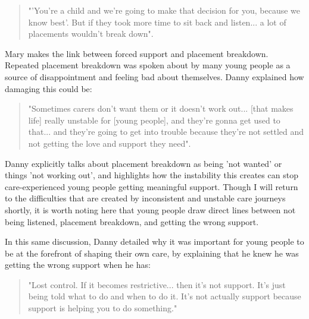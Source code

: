\begin{quote}
"'You're a child and we're going to make that decision for you, because we know best'. But if they took more time to sit back and listen... a lot of placements wouldn't break down".
\end{quote}
Mary makes the link between forced support and placement breakdown. Repeated placement breakdown was spoken about by many young people as a source of disappointment and feeling bad about themselves. Danny explained how damaging this could be:

\begin{quote}
"Sometimes carers don't want them or it doesn't work out... [that makes life] really unstable for [young people], and they're gonna get used to that... and they're going to get into trouble because they're not settled and not getting the love and support they need".
\end{quote}

Danny explicitly talks about placement breakdown as being 'not wanted' or things 'not working out', and highlights how the instability this creates can stop care-experienced young people getting meaningful support. Though I will return to the difficulties that are created by inconsistent and unstable care journeys shortly, it is worth noting here that young people draw direct lines between not being listened, placement breakdown, and getting the wrong support.

In this same discussion, Danny detailed why it was important for young people to be at the forefront of shaping their own care, by explaining that he knew he was getting the wrong support when he has:

\begin{quote}
"Lost control. If it becomes restrictive... then it's not support. It's just being told what to do and when to do it. It's not actually support because support is helping you to do something."
\end{quote}


